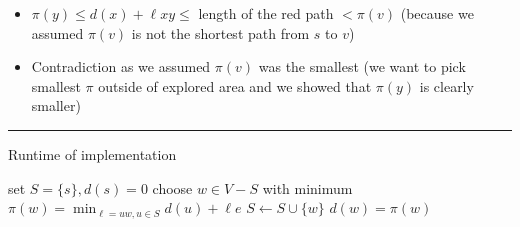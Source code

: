 \documentclass[11pt]{article}
\begin{document}
\begin{itemize}
\begin{center}
\end{center}
\begin{itemize}
\item \(\pi (y)\leq d(x)+\ell xy \leq\) length of the red path \(<\pi(v)\) (because we assumed \(\pi(v)\) is not the shortest path from \(s\) to \(v\))
\item Contradiction as we assumed \(\pi(v)\) was the smallest (we want to pick smallest \(\pi\) outside of explored area and we showed that \(\pi(y)\) is clearly smaller)
\end{itemize}
\end{itemize}

\noindent\rule{\textwidth}{0.5pt}
Runtime of implementation
\begin{algorithmic}
  \State set $S = \{s\}, d(s)=0$
   choose $w \in V-S$ with minimum
  $\pi(w)=\min_{\ell=uw,u\in S}d(u)+\ell e$
  \State $S \gets S \cup \{w\}$
  \State $d(w)=\pi(w)$
  \EndWhile
\end{algorithmic}
\end{document}
